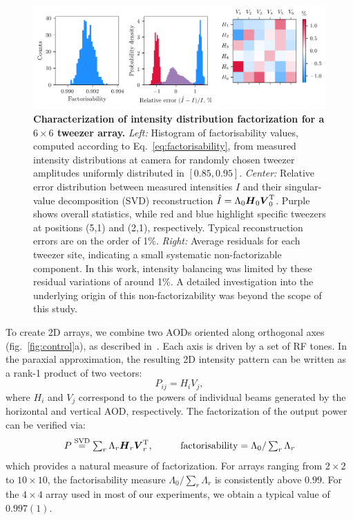 \begin{figure}
    \centering
    \includegraphics{fig-py/factorisability.pdf}
    \caption{
        \textbf{Characterization of intensity distribution factorization for a $6\times 6$ tweezer array.} 
        \textit{Left:} Histogram of factorisability values, computed according to Eq.~\eqref{eq:factorisability}, from measured intensity distributions at camera for randomly chosen tweezer amplitudes uniformly distributed in $[0.85, 0.95]$.  
        \textit{Center:} Relative error distribution between measured intensities $I$ and their singular-value decomposition (SVD) reconstruction $\hat{I} = \Lambda_0 \boldsymbol{H}_0 \boldsymbol{V}_0^{\textnormal{T}}$. Purple shows overall statistics, while red and blue highlight specific tweezers at positions (5,1) and (2,1), respectively. Typical reconstruction errors are on the order of 1\%.
        \textit{Right:} Average residuals for each tweezer site, indicating a small systematic non-factorizable component. In this work, intensity balancing was limited by these residual variations of around 1\%. A detailed investigation into the underlying origin of this non-factorizability was beyond the scope of this study.
        }
    \label{fig:factorisability}
\end{figure}




To create 2D arrays, we combine two AODs oriented along orthogonal axes (fig.~\ref{fig:control}a), as described in~\cite{culemann_construction_2024}.
Each axis is driven by a set of RF tones. In the paraxial approximation, the resulting 2D intensity pattern can be written as a rank-1 product of two vectors:
\begin{equation*}
    P_{ij} = H_i V_j,
\end{equation*}
where $H_i$ and $V_j$ correspond to the powers of individual beams generated by the horizontal and vertical AOD, respectively. The factorization of the output power can be verified via:
\begin{equation}
\label{eq:factorisability}
    P \overset{\mathrm{SVD}}{=} \textstyle \sum_r \Lambda_r \vc{H}_r \vc{V}_r\T,
    \hspace{10 mm} 
    \text{factorisability} = \Lambda_0 / \sum_r \Lambda_r 
\end{equation}
which provides a natural measure of factorization. For arrays ranging from $2\times2$ to $10\times10$, the factorisability measure $\Lambda_0 / \sum_r \Lambda_r$ is consistently above $0.99$. For the $4\times4$ array used in most of our experiments, we obtain a typical value of $0.997(1)$.

